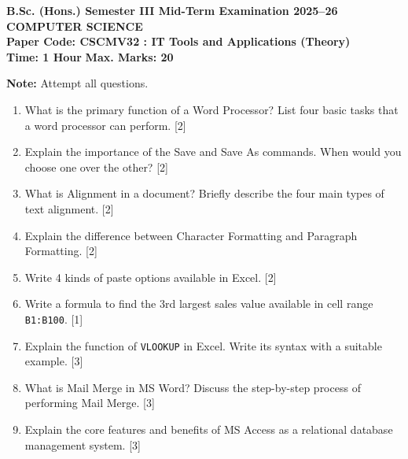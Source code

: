 \documentclass[11pt,a4paper]{article}
\begin{document}
\begin{center}
    {\Large   \textbf{B.Sc. (Hons.) Semester III Mid-Term Examination 2025--26}}\\[4pt]
    {\large   \textbf{COMPUTER SCIENCE}}\\[4pt]
   \textbf{Paper Code: CSCMV32 : IT Tools and Applications (Theory)}\\[6pt]
   \textbf{Time: 1 Hour} \hfill   \textbf{Max. Marks: 20}
\end{center}
\hr




\noindent   \textbf{Note:} Attempt all questions.


\begin{enumerate}[label=   \textbf{\arabic*.}]
    \item What is the primary function of a Word Processor? List four basic tasks that a word processor can perform. \hfill [2]
    \item Explain the importance of the Save and Save As commands. When would you choose one over the other? \hfill [2]
    \item What is Alignment in a document? Briefly describe the four main types of text alignment. \hfill [2]
    \item Explain the difference between Character Formatting and Paragraph Formatting. \hfill [2]
    \item Write 4 kinds of paste options available in Excel. \hfill [2]
    \item Write a formula to find the 3rd largest sales value available in cell range   \texttt{B1:B100}. \hfill [1]
    \item Explain the function of   \texttt{VLOOKUP} in Excel. Write its syntax with a suitable example. \hfill [3]
    \item What is Mail Merge in MS Word? Discuss the step-by-step process of performing Mail Merge. \hfill [3]
    \item Explain the core features and benefits of MS Access as a relational database management system. \hfill [3]
\end{enumerate}
\end{document}
